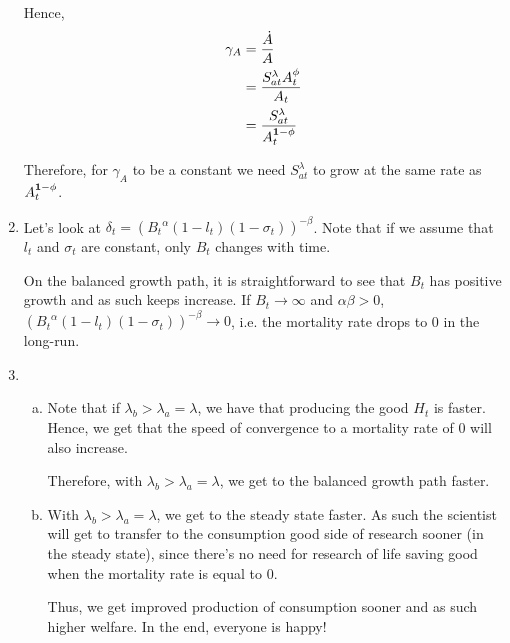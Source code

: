 \documentclass[12pt]{article}
\newcommand{\1}{{\bf 1}} %
\begin{document}
\begin{enumerate}[(1)]
		Hence,
		\begin{align*}
		 \gamma_A& = 	\frac{\dot{A}}{A} \\
		 &=	\frac{S_{at}^\lambda A_t^\phi }{A_t}\\
		 &=	\frac{S_{at}^\lambda }{A_t^{\1-\phi}}
		\end{align*}
		
		Therefore, for $\gamma_A$ to be a constant we need $S_{at}^\lambda$ to grow at the same rate as $A_t^{\1-\phi}$.
	
	\item 
	
	Let's look at $\delta_t = ({B_t}^{\alpha} (1-l_t)(1-\sigma_t))^{-\beta}$. Note that if we assume that $l_t$ and $\sigma_t$ are constant, only $B_t$ changes with time.
	
	On the balanced growth path, it is straightforward to see that $B_t$ has positive growth and as such keeps increase. If $B_t\to \infty$ and $\alpha\beta>0$, $({B_t}^{\alpha} (1-l_t)(1-\sigma_t))^{-\beta} \to 0$, i.e. the mortality rate drops to 0 in the long-run.

	
	\item 
	\begin{enumerate}[(a)]
		\item 
		
		Note that if $\lambda_b>\lambda_a =\lambda$, we have that producing the good $H_t$ is faster. Hence, we get that the speed of convergence to a mortality rate of $0$ will also increase.
		
		Therefore, with $\lambda_b>\lambda_a =\lambda$, we get to the balanced growth path faster.
		
		\item
		
		With $\lambda_b>\lambda_a =\lambda$, we get to the steady state faster. As such the scientist will get to transfer to the consumption good side of research sooner (in the steady state), since there's no need for research of life saving good when the mortality rate is equal to 0. 
		
		Thus, we get improved production of consumption sooner and as such higher welfare. In the end, everyone is happy!
	\end{enumerate}
\end{enumerate}
	
\end{document}
